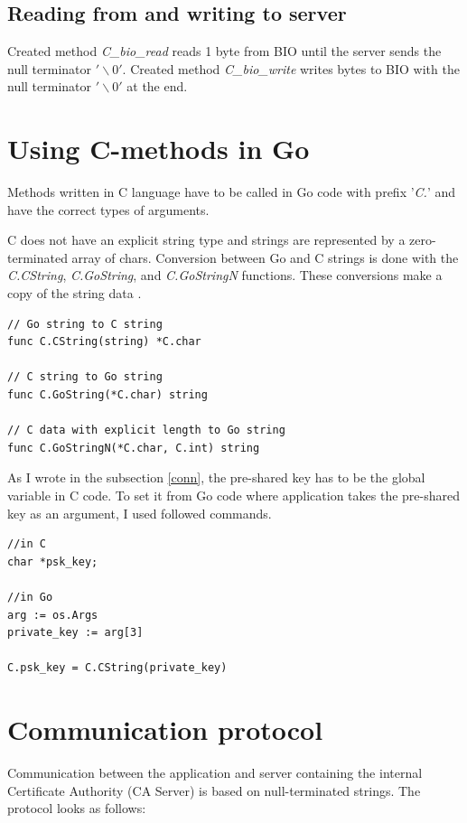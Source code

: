 \documentclass[
  twoside, 12pt, 
  printed, %
  notable,   %
  lof,     %
  lot,     %
]{fithesis3}
\begin{document}
\subsection{Reading from and writing to server}
Created method \textit{C\_bio\_read} reads 1 byte from BIO until the server sends the null 
terminator $'\backslash0'$. Created method \textit{C\_bio\_write} writes bytes to BIO with the 
null terminator $'\backslash0'$ at the end.

\section{Using C-methods in Go}\label{c-method}
Methods written in C language have to be called in Go code with prefix '\textit{C.}' and have the 
correct types of arguments. 

C does not have an explicit string type and strings are represented by 
a zero-terminated array of chars. Conversion between Go and C strings is done with the 
\textit{C.CString}, \textit{C.GoString}, and \textit{C.GoStringN} functions. These conversions 
make a copy of the string data \cite{bloggolangorg}. 

\begin{lstlisting}
// Go string to C string
func C.CString(string) *C.char

// C string to Go string
func C.GoString(*C.char) string

// C data with explicit length to Go string
func C.GoStringN(*C.char, C.int) string
\end{lstlisting}

As I wrote in the subsection \ref{conn}, the pre-shared key has to be the global variable in C 
code. To set it from Go code where application takes the pre-shared key as an argument, I used 
followed commands.
\begin{lstlisting}
//in C
char *psk_key;

//in Go
arg := os.Args
private_key := arg[3]

C.psk_key = C.CString(private_key)
\end{lstlisting}

\section{Communication protocol}\label{comprot}
Communication between the application and server containing the internal Certificate Authority (CA Server) is based on null-terminated strings. The protocol looks as follows:
\end{document}
